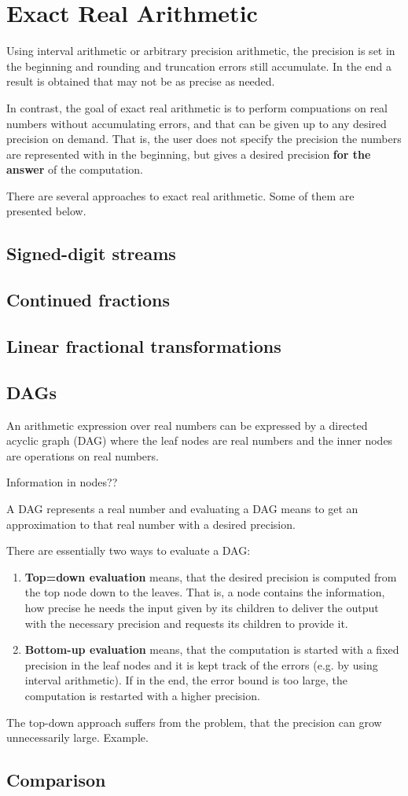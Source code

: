 \section{Exact Real Arithmetic}
	Using interval arithmetic or arbitrary precision arithmetic, 
	the precision is set in the beginning and rounding and truncation errors still accumulate.
	In the end a result is obtained that may not be as precise as needed.

	In contrast, the goal of exact real arithmetic is to perform compuations on real numbers without 
	accumulating errors, and that can be given up to any desired precision on demand.
	That is, the user does not specify the precision the numbers are represented with in the beginning,
	but gives a desired precision \textbf{for the answer} of the computation.

	There are several approaches to exact real arithmetic.
	Some of them are presented below. 

	\subsection{Signed-digit streams}
	\subsection{Continued fractions}
	\subsection{Linear fractional transformations}
	\subsection{DAGs}
		An arithmetic expression over real numbers can be expressed by a directed acyclic graph (DAG)
		where the leaf nodes are real numbers and the inner nodes are operations on real numbers.
		
		Information in nodes??

		A DAG represents a real number and evaluating a DAG means to get an approximation to that real number
		with a desired precision.

		There are essentially two ways to evaluate a DAG:
		\begin{enumerate}
			\item \textbf{Top=down evaluation} means, that the desired precision is computed from the top node down to the leaves.
			That is, a node contains the information, how precise he needs the input given by its children to deliver the output with the necessary precision and requests its children to provide it.  
			\item \textbf{Bottom-up evaluation} means, that the computation is started with a fixed precision in the leaf nodes 
			and it is kept track of the errors (e.g. by using interval arithmetic). 
			If in the end, the error bound is too large, the computation is restarted with a higher precision. 
		\end{enumerate}
		The top-down approach suffers from the problem, that the precision can grow unnecessarily large.   
		Example.
	\subsection{Comparison}



